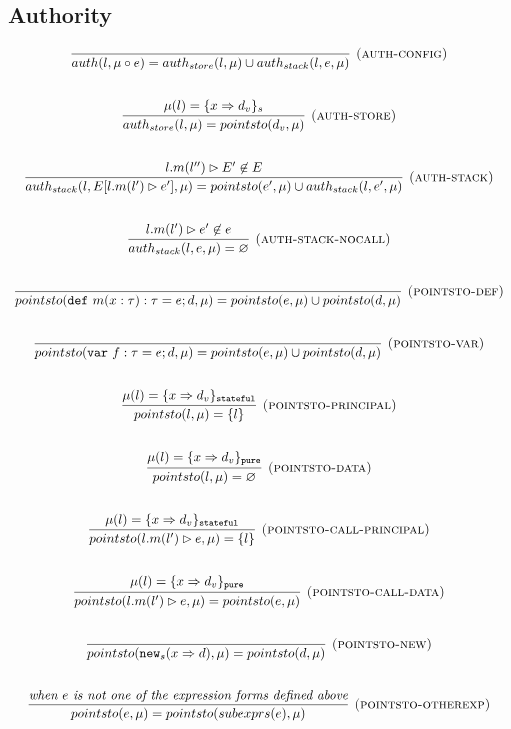 \documentclass{llncs}
\newcommand{\keywadj}[1]{\mathtt{#1}}
\newcommand{\keyw}[1]{\keywadj{#1}~}
\begin{document}
\newpage

\subsection{Authority}

\[
\begin{array}{c}
\infer[\textsc{(auth-config)}]
  {auth(l,\mu \circ e) = auth_{store}(l,\mu) \cup auth_{stack}(l,e,\mu)}
  {}\\[5ex]

\infer[\textsc{(auth-store)}]
  {auth_{store}(l,\mu) = pointsto(d_v,\mu)}
  {\mu(l) = \{ x \Rightarrow d_v \}_{s}}\\[5ex]
  
\infer[\textsc{(auth-stack)}]
  {auth_{stack}(l,E[l.m(l') \rhd e'],\mu) = pointsto(e',\mu) \cup auth_{stack}(l,e',\mu)}
  {l.m(l'') \rhd E' \not\in E}\\[5ex]
  
\infer[\textsc{(auth-stack-nocall)}]
  {auth_{stack}(l,e,\mu) = \varnothing}
  {l.m(l') \rhd e' \not\in e}\\[5ex]
  
\infer[\textsc{(pointsto-def)}]
  {pointsto(\keyw{def} m(x:\tau):\tau = e; d,\mu) = pointsto(e,\mu) \cup pointsto(d,\mu)}
  {}\\[5ex]
  
\infer[\textsc{(pointsto-var)}]
  {pointsto(\keyw{var} f:\tau = e; d,\mu) = pointsto(e,\mu) \cup pointsto(d,\mu)}
  {}\\[5ex]
  
\infer[\textsc{(pointsto-principal)}]
  {pointsto(l,\mu) = \{ l \}}
  {\mu(l) = \{ x \Rightarrow d_v \}_\keywadj{stateful}}\\[5ex]
  
\infer[\textsc{(pointsto-data)}]
  {pointsto(l,\mu) = \varnothing }
  {\mu(l) = \{ x \Rightarrow d_v \}_\keywadj{pure}}\\[5ex]

\infer[\textsc{(pointsto-call-principal)}]
  {pointsto(l.m(l') \rhd e,\mu) = \{l\} }
  {\mu(l) = \{ x \Rightarrow d_v \}_\keywadj{stateful}}\\[5ex]
  
\infer[\textsc{(pointsto-call-data)}]
  {pointsto(l.m(l') \rhd e,\mu) = pointsto(e,\mu)}
  {\mu(l) = \{ x \Rightarrow d_v \}_\keywadj{pure}}\\[5ex]
  
\infer[\textsc{(pointsto-new)}]
  {pointsto(\keywadj{new}_{s}(x \Rightarrow d),\mu) = pointsto(d,\mu) }
  {}\\[5ex]
  
\infer[\textsc{(pointsto-otherexp)}]
  {pointsto(e,\mu) = pointsto(subexprs(e),\mu) }
  {\textit{when $e$ is not one of the expression forms defined above}}\\[5ex]

\end{array}
\]
\end{document}
